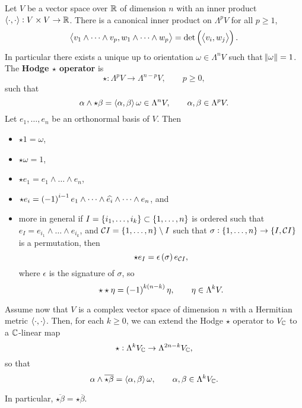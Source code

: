 Let $ V $ be a vector space over $ \mathbb{R} $ of dimension $ n $ with an inner product $ \left\langle \cdot, \cdot \right\rangle : V \times V \to \mathbb{R} $. There is a canonical inner product on $ \Lambda^pV $ for all $ p \ge 1 $,
$$ \abr{v_1 \wedge \dots \wedge v_p, w_1 \wedge \dots \wedge w_p} = \det \br{\abr{v_i, w_j}}. $$
In particular there exists a unique up to orientation $ \omega \in \Lambda^nV $ such that $ \norm{\omega} = 1 $. The \textbf{Hodge $ \star $ operator} is
$$ \star : \Lambda^pV \to \Lambda^{n - p}V, \qquad p \ge 0, $$
such that
$$ \alpha \wedge \star\beta = \left\langle \alpha, \beta \right\rangle\omega \in \Lambda^nV, \qquad \alpha, \beta \in \Lambda^pV. $$
Let $ e_1, \dots, e_n $ be an orthonormal basis of $ V $. Then
\begin{itemize}
\item $ \star 1 = \omega $,
\item $ \star\omega = 1 $,
\item $ \star e_1 = e_1 \wedge \dots \wedge e_n $,
\item $ \star e_i = \br{-1}^{i - 1}e_1 \wedge \dots \wedge \widehat{e_i} \wedge \dots \wedge e_n $, and
\item more in general if $ I = \cbr{i_1, \dots, i_k} \subset \cbr{1, \dots, n} $ is ordered such that $ e_I = e_{i_1} \wedge \dots \wedge e_{i_k} $, and $ \CCC I = \cbr{1, \dots, n} \setminus I $ such that $ \sigma : \cbr{1, \dots, n} \to \cbr{I, \CCC I} $ is a permutation, then
$$ \star e_I = \epsilon\br{\sigma}e_{\CCC I}, $$
where $ \epsilon $ is the signature of $ \sigma $, so
$$ \star\star\eta = \br{-1}^{k\br{n - k}}\eta, \qquad \eta \in \Lambda^kV. $$
\end{itemize}
Assume now that $ V $ is a complex vector space of dimension $ n $ with a Hermitian metric $ \left\langle \cdot, \cdot \right\rangle $. Then, for each $ k \ge 0 $, we can extend the Hodge $ \star $ operator to $ V_{\mathbb{C}} $ to a $ \mathbb{C} $-linear map
$$ \star : \Lambda^kV_{\mathbb{C}} \to \Lambda^{2n - k}V_{\mathbb{C}}, $$
so that
$$ \alpha \wedge \overline{\star\beta} = \left\langle \alpha, \beta \right\rangle\omega, \qquad \alpha, \beta \in \Lambda^kV_{\mathbb{C}}. $$

\begin{note*}
In particular, $ \overline{\star\beta} = \star\overline{\beta} $.
\end{note*}

\pagebreak

